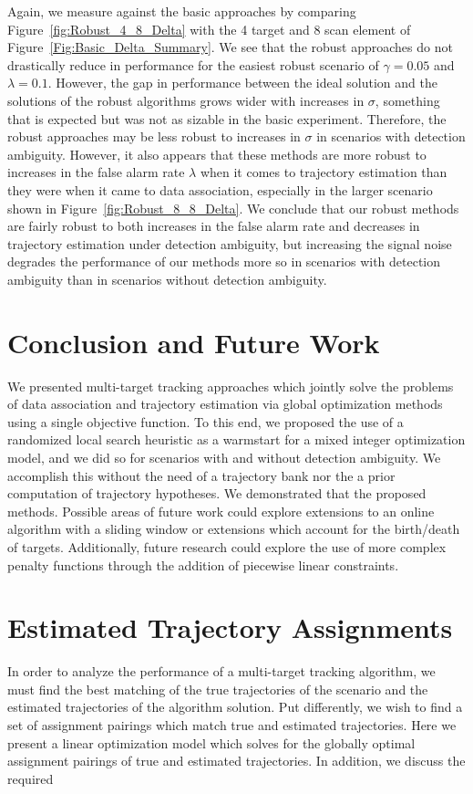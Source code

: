 \documentclass[journal]{IEEEtran}
\begin{document}
Again, we measure against the basic approaches by comparing Figure~\ref{fig:Robust_4_8_Delta} with the 4 target and 8 scan element of Figure~\ref{Fig:Basic_Delta_Summary}. We see that the robust approaches do not drastically reduce in performance for the easiest robust scenario of $\gamma = 0.05$ and $\lambda = 0.1$. However, the gap in performance between the ideal solution and the solutions of the robust algorithms grows wider with increases in $\sigma$, something that is expected but was not as sizable in the basic experiment. Therefore, the robust approaches may be less robust to increases in $\sigma$ in scenarios with detection ambiguity. However, it also appears that these methods are more robust to increases in the false alarm rate $\lambda$ when it comes to trajectory estimation than they were when it came to data association, especially in the larger scenario shown in Figure~\ref{fig:Robust_8_8_Delta}. We conclude that our robust methods are fairly robust to both increases in the false alarm rate and decreases in trajectory estimation under detection ambiguity, but increasing the signal noise degrades the performance of our methods more so in scenarios with detection ambiguity than in scenarios without detection ambiguity.

\section{Conclusion and Future Work}\label{sec:Conclusion}
We presented multi-target tracking approaches which jointly solve the problems of data association and trajectory estimation via global optimization methods using a single objective function. To this end, we proposed the use of a randomized local search heuristic as a warmstart for a mixed integer optimization model, and we did so for scenarios with and without detection ambiguity. We accomplish this without the need of a trajectory bank nor the a prior computation of trajectory hypotheses. We demonstrated that the proposed methods. Possible areas of future work could explore extensions to an online algorithm with a sliding window or extensions which account for the birth/death of targets. Additionally, future research could explore the use of more complex penalty functions through the addition of piecewise linear constraints. 

\appendices
\section{Estimated Trajectory Assignments}\label{sec:Assignment_Appendix}
In order to analyze the performance of a multi-target tracking algorithm, we must find the best matching of the true trajectories of the scenario and the estimated trajectories of the algorithm solution. Put differently, we wish to find a set of assignment pairings which match true and estimated trajectories. Here we present a linear optimization model which solves for the globally optimal assignment pairings of true and estimated trajectories. In addition, we discuss the required 
\end{document}
